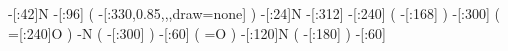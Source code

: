                   -[:42]N%
                  -[:96]%
                           (
    -[:330,0.85,,,draw=none]%
                           )
                  -[:24]N%
                 -[:312]%
                 -[:240]%
                           (
                     -[:168]\phantom{N}%
                           )
                 -[:300]%
                           (
                     =[:240]O%
                           )
                       -N%
                           (
                     -[:300]%
                           )
                  -[:60]%
                           (
                           =O%
                           )
                 -[:120]N%
                           (
                     -[:180]%
                           )
                  -[:60]%